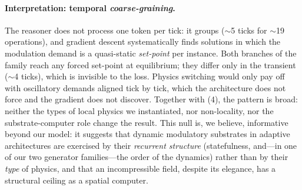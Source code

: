 \documentclass{article}
\begin{document}
\paragraph{Interpretation: temporal \emph{coarse-graining}.} The reasoner does
not process one token per tick: it groups ($\sim$5 ticks for $\sim$19
operations), and gradient descent systematically finds solutions in which the
modulation demand is a quasi-static \emph{set-point} per instance. Both branches
of the family reach any forced set-point at equilibrium; they differ only in the
transient ($\sim$4 ticks), which is invisible to the loss. Physics switching
would only pay off with oscillatory demands aligned tick by tick, which the
architecture does not force and the gradient does not discover. Together with
(4), the pattern is broad: neither the types of local physics we instantiated, nor
non-locality, nor the substrate-computer role change the result. This null is, we
believe, informative beyond our model: it suggests that dynamic modulatory
substrates in adaptive architectures are exercised by their \emph{recurrent
structure} (statefulness, and---in one of our two generator families---the
order of the dynamics) rather than by their \emph{type} of physics, and
that an incompressible field, despite its elegance, has a structural ceiling as a
spatial computer.
\end{document}
